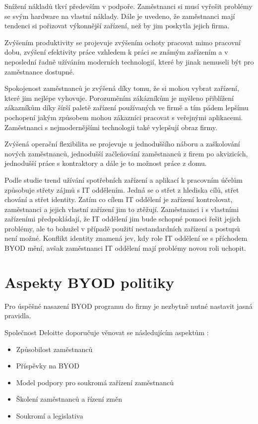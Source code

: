 Snížení nákladů tkví především v podpoře. Zaměstnanci si musí vyřešit problémy se svým hardware na vlastní náklady. Dále je uvedeno, že zaměstnanci mají tendenci si pořizovat výkonnější zařízení, než by jim poskytla jejich firma. 

Zvýšením produktivity se projevuje zvýšením ochoty pracovat mimo pracovní dobu, zvýšení efektivity práce vzhledem k práci se známým zařízením a v neposlední řadně užíváním moderních technologií, které by jinak nemuseli být pro zaměstnance dostupné. 

Spokojenost zaměstnanců je zvýšená díky tomu, že si mohou vybrat zařízení, které jim nejlépe vyhovuje. Porozuměním zákázníkům je myšleno přiblížení zákazníkům díky šírší paletě zařízení používaných ve firmě a tím pádem lepšímu pochopení jakým způsobem mohou zákazníci pracovat s veřejnými aplikacemi. Zaměstnanci s nejmodernějšími technologii také vylepšují obraz firmy.

Zvýšená operační flexibilita se projevuje u jednoduššího náboru a zaškolování nových zaměstnanců, jednodušší začleňování zaměstnanců z firem po akvizicích, jednodušší práce s kontraktory a dále je to možnost práce z domu.


Podle studie  trend užívání spotřebních zařízení a aplikací k pracovním účelům způsobuje střety zájmů s IT oddělením. Jedná se o střet z hlediska cílů, střet chování a střet identity. Zatím co cílem IT oddělení je zařízení kontrolovat, zaměstnanci a jejich vlastní zařízení jim to ztěžují. Zaměstnanci i s vlastními zařízeními předpokládají, že IT oddělení jim bude schopné pomoci řešit jejich problémy, ale to bohužel v případě použití nestandardních zařízení a postupů není možné. Konflikt identity znamená jev, kdy role IT oddělení se s příchodem BYOD mění, avšak zaměstnanci IT oddělení mají problémy novou roli uchopit.

\section{Aspekty BYOD politiky}

Pro úspěšné nasazení BYOD programu do firmy je nezbytně nutné nastavit jasná pravidla.

Společnost Deloitte doporučuje věnovat se následujícím aspektům :
\begin{itemize}
\item Způsobilost zaměstnanců
\item Příspěvky na BYOD
\item Model podpory pro soukromá zařízení zaměstnanců
\item Školení zaměstnanců a řízení změn
\item Soukromí a legislativa
\end{itemize}

